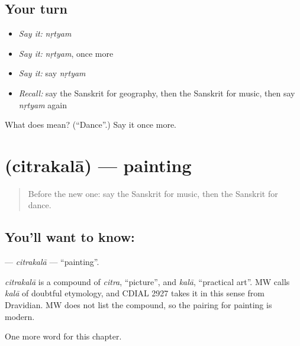 \subsection*{Your turn}
\begin{itemize}
\raggedright
  \item \emph{Say it:} \emph{nṛtyam}
  \item \emph{Say it:} \emph{nṛtyam}, once more
  \item \emph{Say it:} say \emph{nṛtyam}
  \item \emph{Recall:} say the Sanskrit for geography, then the Sanskrit for music, then say \emph{nṛtyam} again
\end{itemize}

\begin{tcolorbox}[breakable,colback=teal!4,colframe=teal!35!black,title={Before you move on}]
What does  mean? (\textquotedblleft{}Dance\textquotedblright{}.) Say it once more.
\end{tcolorbox}
\section[\texorpdfstring{\sk{चित्रकला} (citrakalā)}{चित्रकला (citrakalā)}]{ (citrakalā) — painting}

\label{lesson:SA-C228-citrakala}



\begin{quote}
Before the new one: say the Sanskrit for music, then the Sanskrit for dance.
\end{quote}

\subsection*{You'll want to know: }
\textbf{} — \emph{citrakalā} — \textquotedblleft{}painting\textquotedblright{}.

\begin{cousinweb}
\emph{citrakalā} is a compound of \emph{citra}, \textquotedblleft{}picture\textquotedblright{}, and \emph{kalā}, \textquotedblleft{}practical art\textquotedblright{}. MW calls \emph{kalā} of doubtful etymology, and CDIAL 2927 takes it in this sense from Dravidian. MW does not list the compound, so the pairing for painting is modern.
\end{cousinweb}

\begin{grammarlens}[title={What you've built}]
One more word for this chapter.
\end{grammarlens}

